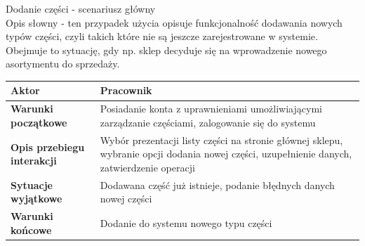  \item Dodanie części - scenariusz główny \\
 
 Opis słowny - ten przypadek użycia opisuje funkcjonalność dodawania nowych typów części, czyli takich które nie są jeszcze zarejestrowane w systemie. Obejmuje to sytuację, gdy np. sklep decyduje się na wprowadzenie nowego asortymentu do sprzedaży.
 
 \begin{longtable}{|p{5cm}|p{7cm}|}
 	\hline
	\textbf{Aktor} & Pracownik \\
	\hline
	\textbf{Warunki początkowe} & Posiadanie konta z uprawnieniami umożliwiającymi zarządzanie częściami, zalogowanie się do systemu \\
	\hline
	\textbf{Opis przebiegu interakcji} & Wybór prezentacji listy części na stronie głównej sklepu, wybranie opcji dodania nowej części, uzupełnienie danych, zatwierdzenie operacji \\
	\hline
	\textbf{Sytuacje wyjątkowe} & Dodawana część już istnieje, podanie błędnych danych nowej części \\
	\hline
	\textbf{Warunki końcowe} & Dodanie do systemu nowego typu części \\
	\hline
 \end{longtable}
 

